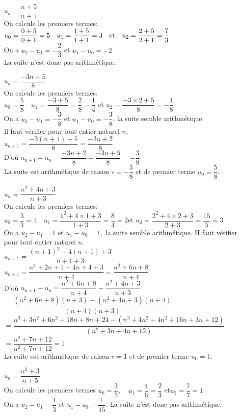 \documentclass[a4paper,french]{book}
\begin{document}
\begin{enumMet}
    \item $u_{n}=\dfrac{n+5}{n+1}$\\
    On calcule les premiers termes:\\
    $u_{0}=\dfrac{0+5}{0+1}=5\quad  u_{1}=\dfrac{1+5}{1+1}=3 \text {\quad et\quad  } u_{2}=\dfrac{2+5}{2+1}=\dfrac{7}{3}$\\
    On a $u_{2}-u_{1}=-\dfrac{2}{3}$ et $u_{1}-u_{0}=-2$\\
    La suite n'est donc pas arithmétique.
    \item $u_{n}=\dfrac{-3 n+5}{8}$\\
    On calcule les premiers termes:\\
    $u_{0}=\dfrac{5}{8}\quad u_{1}=\dfrac{-3+5}{8}=\dfrac{2}{8}=\dfrac{1}{4}$ \quad et\quad 
    $u_{2}=\dfrac{-3 \times 2+5}{8}=-\dfrac{1}{8}$\\
    On a $u_{2}-u_{1}=-\dfrac{3}{8}$ et $u_{1}-u_{0}=-\dfrac{3}{8}$, la suite semble arithmétique.\\
    Il faut vérifier pour tout entier naturel $n$.\\
    $u_{n+1}=\dfrac{-3(n+1)+5}{8}=\dfrac{-3 n+2}{8}$\\
    D'où $u_{n+1}-u_{n}=\dfrac{-3 n+2}{8}-\dfrac{-3 n+5}{8}=-\dfrac{3}{8}$\\
    La suite est arithmétique de raison $r=-\dfrac{3}{8}$ et de premier terme $u_{0}=\dfrac{5}{8}$.
    \item $u_{n}=\dfrac{n^{2}+4 n+3}{n+3}$\\
    On calcule les premiers termes:\\
    $u_{0}=\dfrac{3}{3}=1\quad u_{1}=\dfrac{1^{2}+4 \times 1+3}{1+3}=\dfrac{8}{4}=2$\quad et \quad   $u_2=\dfrac{2^{2}+4 \times 2+3}{2+3}=\dfrac{15}{5}=3$\\
    On a $u_{2}-u_{1}=1$ et $u_{1}-u_{0}=1,$ la suite semble arithmétique. II faut vérifier pour tout entier naturel $n$.\\
    $u_{n+1}=\dfrac{(n+1)^{2}+4(n+1)+3}{n+1+3}$\\
    $u_{n+1}=\dfrac{n^{2}+2 n+1+4 n+4+3}{n+4}=\dfrac{n^{2}+6 n+8}{n+4}$\\
    D'où $u_{n+1}-u_{n}=\dfrac{n^{2}+6 n+8}{n+4}-\dfrac{n^{2}+4 n+3}{n+3}$\\
    $=\dfrac{\left(n^{2}+6 n+8\right)(n+3)-\left(n^{2}+4 n+3\right)(n+4)}{(n+4)(n+3)}$\\
    $=\dfrac{n^{3}+3 n^{2}+6 n^{2}+18 n+8 n+24-\left(n^{3}+4 n^{2}+4 n^{2}+16 n+3 n+12\right)}{\left(n^{2}+3 n+4 n+12\right)}$\\
    $=\dfrac{n^{2}+7 n+12}{n^{2}+7 n+12}=1$\\
    La suite est arithmétique de raison $r=1$ et de premier terme $u_{0}=1$. 
    \item $u_{n}=\dfrac{n^{2}+3}{n+5}$\\
    On calcule les premiers termes $u_{0}=\dfrac{3}{5},\quad u_{1}=\dfrac{4}{6}=\dfrac{2}{3}$ \quad et\quad  $u_{2}=\dfrac{7}{7}=1$\\
    On a $u_{2}-u_{1}=\dfrac{1}{3}$ et $u_{1}-u_{0}=\dfrac{1}{15}$. La suite n'est donc pas arithmétique.
\end{enumMet}
\end{document}
